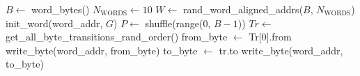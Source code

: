 \begin{algorithm}[!t]
\footnotesize
\caption{1-byte test pattern generation \label{alg:1byte}}
\begin{algorithmic}[1]
\State $B \gets$ word\_bytes() 
\State $N_{\text{WORDS}} \gets 10$
\State $W \gets$ rand\_word\_aligned\_addrs($B$, $N_{\text{WORDS}}$)
        \State init\_word(word\_addr, $G$) 
        \State $P \gets$ shuffle(range(0, $B{-}1$))
            \State $Tr \gets$ get\_all\_byte\_transitions\_rand\_order()
            \State from\_byte $\gets$ Tr[0].from
            \State write\_byte(word\_addr, from\_byte)
                \State to\_byte $\gets$ tr.to
                \State write\_byte(word\_addr, to\_byte)
            \EndFor
        \EndFor
    \EndFor
\EndFor
\end{algorithmic}
\end{algorithm}
